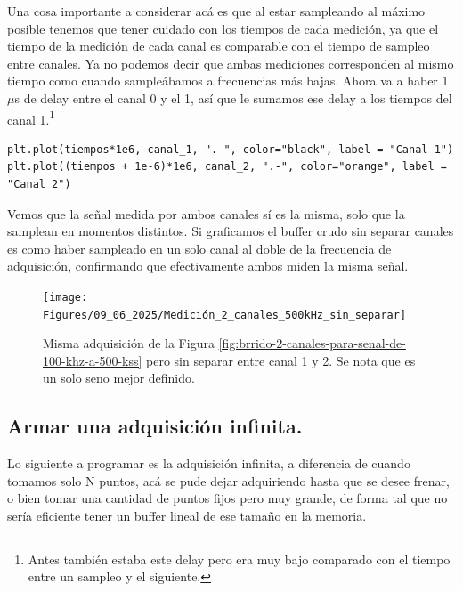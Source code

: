 Una cosa importante a considerar acá es que al estar sampleando al máximo posible tenemos que tener cuidado con los tiempos de cada medición, ya que el tiempo de la medición de cada canal es comparable con el tiempo de sampleo entre canales. Ya no podemos decir que ambas mediciones corresponden al mismo tiempo como cuando sampleábamos a frecuencias más bajas. Ahora va a haber 1 $\mu$s de delay entre el canal 0 y el 1, así que le sumamos ese delay a los tiempos del canal 1.\footnote{Antes también estaba este delay pero era muy bajo comparado con el tiempo entre un sampleo y el siguiente.}

\begin{lstlisting}
plt.plot(tiempos*1e6, canal_1, ".-", color="black", label = "Canal 1")
plt.plot((tiempos + 1e-6)*1e6, canal_2, ".-", color="orange", label = "Canal 2")

\end{lstlisting} 



Vemos que la señal medida por ambos canales sí es la misma, solo que la samplean en momentos distintos. Si graficamos el buffer crudo sin separar canales es como haber sampleado en un solo canal al doble de la frecuencia de adquisición, confirmando que efectivamente ambos miden la misma señal.

\begin{figure}[th!]
	\centering
	\texttt{[image: Figures/09\_06\_2025/Medición\_2\_canales\_500kHz\_sin\_separar]}
	\caption{Misma adquisición de la Figura \ref{fig:brrido-2-canales-para-senal-de-100-khz-a-500-kss} pero sin separar entre canal 1 y 2. Se nota que es un solo seno mejor definido.}
	\label{fig:medicion2canales500khzsinseparar}
\end{figure}


\subsection*{Armar una adquisición infinita.}
Lo siguiente a programar es la adquisición infinita, a diferencia de cuando tomamos solo N puntos, acá se pude dejar adquiriendo hasta que se desee frenar, o bien tomar una cantidad de puntos fijos pero muy grande, de forma tal que no sería eficiente tener un buffer lineal de ese tamaño en la memoria. 

